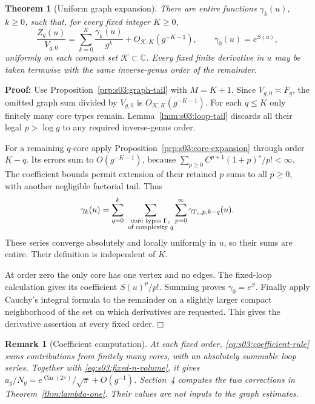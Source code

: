 \documentclass[a4paper,10pt]{article}
\numberwithin{equation}{section}
\DeclareMathOperator{\Cin}{\mathrm{Cin}}
\theoremstyle{paperplain}
\newtheorem{thm}{Theorem}[section]
\theoremstyle{paperremark}
\newtheorem{rmk}{Remark}[section]
\theoremstyle{paperplain}
\newenvironment{prf}{\noindent \textbf{Proof: }}{\hfill $\mdlgwhtsquare$\par\addvspace{0.5\baselineskip}}
\begin{document}
\begin{thm}[Uniform graph expansion]
\label{thm:s03:graph-expansion}
There are entire functions $\gamma_k(u)$, $k\geq0$, such that,
for every fixed integer $K\geq0$,
\begin{equation}
\label{eq:s03:graph-expansion}
\frac{Z_g(u)}{V_{g,0}}
=\sum_{k=0}^K\frac{\gamma_k(u)}{g^k}
 +O_{\mathcal K,K}(g^{-K-1}),\qquad
\gamma_0(u)=e^{S(u)},
\end{equation}
uniformly on each compact set $\mathcal K\subset\mathbb C$.
Every fixed finite derivative in $u$ may be taken termwise with
the same inverse-genus order of the remainder.
\end{thm}
\begin{prf}
Use Proposition~\ref{prp:s03:graph-tail} with $M=K+1$.
Since $V_{g,0}\asymp F_g$, the omitted graph sum divided by
$V_{g,0}$ is $O_{\mathcal K,K}(g^{-K-1})$.
For each $q\leq K$ only finitely many core types remain.
Lemma~\ref{lmm:s03:loop-tail} discards all their legal
$p>\log g$ to any required inverse-genus order.

For a remaining $q$-core apply
Proposition~\ref{prp:s03:core-expansion} through order $K-q$.
Its errors sum to $O(g^{-K-1})$, because
$\sum_{p\geq0}C^{p+1}(1+p)^s/p!<\infty$.
The coefficient bounds permit extension of their retained $p$ sums
to all $p\geq0$, with another negligible factorial tail.
Thus
\begin{equation}
\label{eq:s03:coefficient-rule}
\gamma_k(u)=
 \sum_{q=0}^k\ \sum_{\substack{\text{core types }\Gamma_{\rm c}\\
                              \text{of complexity }q}}
 \sum_{p=0}^{\infty}\gamma_{\Gamma_{\rm c},p,k-q}(u).
\end{equation}
These series converge absolutely and locally uniformly in $u$, so
their sums are entire. Their definition is independent of $K$.

At order zero the only core has one vertex and no edges.
The fixed-loop calculation gives its coefficient $S(u)^p/p!$.
Summing proves $\gamma_0=e^S$.
Finally apply Cauchy's integral formula to the remainder on a slightly
larger compact neighborhood of the set on which derivatives are
requested. This gives the derivative assertion at every fixed order.
\end{prf}

\begin{rmk}[Coefficient computation]
At each fixed order, \eqref{eq:s03:coefficient-rule} sums contributions
from finitely many cores, with an absolutely summable loop series.
Together with \eqref{eq:s03:fixed-n-volume}, it gives
$a_g/N_g=e^{\Cin(2\pi)}/\sqrt\pi+O(g^{-1})$.
Section~4 computes the two corrections in Theorem~\ref{thm:lambda-one}.
Their values are not inputs to the graph estimates.
\end{rmk}
\end{document}
